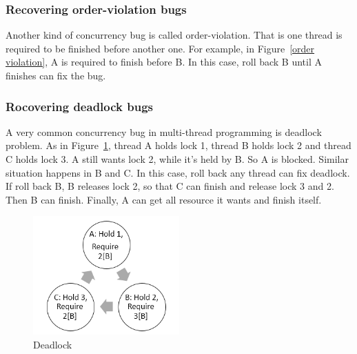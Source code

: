 \subsubsection{Recovering order-violation bugs}
Another kind of concurrency bug is called order-violation. That is one thread is required to be finished before another one. For example, in Figure~\ref{order violation}, A is required to finish before B. In this case, roll back B until A finishes can fix the bug.
\subsubsection{Rocovering deadlock bugs}
A very common concurrency bug in multi-thread programming is deadlock problem. As in Figure~\ref{deadlock}, thread A holds lock 1, thread B holds lock 2 and thread C holds lock 3. A still wants lock 2, while it's held by B. So A is blocked. Similar situation happens in B and C. In this case, roll back any thread can fix deadlock. If roll back B, B releases lock 2, so that C can finish and release lock 3 and 2. Then B can finish. Finally, A can get all resource it wants and finish itself.
\begin{figure}[t]
\centering
\includegraphics[width=0.5\textwidth]{figs/deadlock.png}
\caption{Deadlock}
\label{deadlock}
\end{figure}

